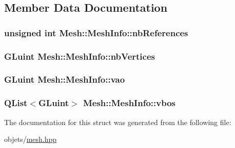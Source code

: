 \subsection{Member Data Documentation}
\hypertarget{struct_mesh_1_1_mesh_info_a8e32fc200e5ed8af32c409cac7b17342}{
\subsubsection[{nb\+References}]{\setlength{\rightskip}{0pt plus 5cm}unsigned int Mesh\+::\+Mesh\+Info\+::nb\+References}}\label{struct_mesh_1_1_mesh_info_a8e32fc200e5ed8af32c409cac7b17342}
\hypertarget{struct_mesh_1_1_mesh_info_a8869e5c769b3895876e32bed8252dffd}{
\subsubsection[{nb\+Vertices}]{\setlength{\rightskip}{0pt plus 5cm}G\+Luint Mesh\+::\+Mesh\+Info\+::nb\+Vertices}}\label{struct_mesh_1_1_mesh_info_a8869e5c769b3895876e32bed8252dffd}
\hypertarget{struct_mesh_1_1_mesh_info_af15096e0f0aa61fff7d8a1c223e547cf}{
\subsubsection[{vao}]{\setlength{\rightskip}{0pt plus 5cm}G\+Luint Mesh\+::\+Mesh\+Info\+::vao}}\label{struct_mesh_1_1_mesh_info_af15096e0f0aa61fff7d8a1c223e547cf}
\hypertarget{struct_mesh_1_1_mesh_info_ad360b326ff7424dc9b6a3f6614af895d}{
\subsubsection[{vbos}]{\setlength{\rightskip}{0pt plus 5cm}Q\+List$<$G\+Luint$>$ Mesh\+::\+Mesh\+Info\+::vbos}}\label{struct_mesh_1_1_mesh_info_ad360b326ff7424dc9b6a3f6614af895d}


The documentation for this struct was generated from the following file\+:\begin{DoxyCompactItemize}
\item 
objets/\hyperlink{mesh_8hpp}{mesh.\+hpp}\end{DoxyCompactItemize}
